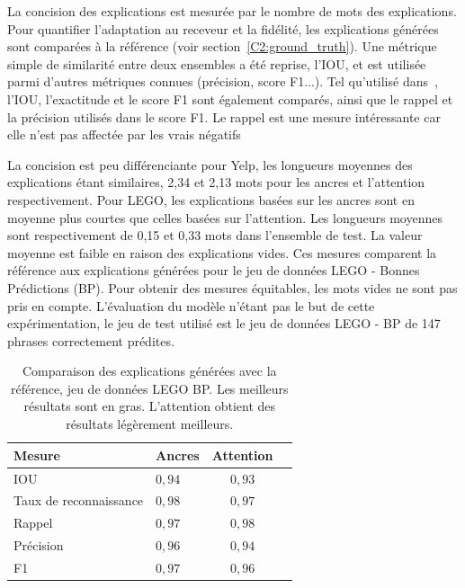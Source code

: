 La concision des explications est mesurée par le nombre de mots des explications.
Pour quantifier l'adaptation au receveur et la fidélité, les explications générées sont comparées à la référence (voir section~\ref{C2:ground_truth}). Une métrique simple de similarité entre deux ensembles a été reprise, l'IOU, et est utilisée parmi d'autres métriques connues (précision, score F1...).
Tel qu'utilisé dans~\cite{Bau2017}, l'IOU, l'exactitude et le score F1 sont également comparés, ainsi que le rappel et la précision utilisés dans le score F1. Le rappel est une mesure intéressante car elle n'est pas affectée par les vrais négatifs

La concision est peu différenciante pour Yelp, les longueurs moyennes des explications étant similaires, 2,34 et 2,13 mots pour les ancres et l'attention respectivement.
Pour LEGO, les explications basées sur les ancres sont en moyenne plus courtes que celles basées sur l'attention. Les longueurs moyennes sont respectivement de 0,15 et 0,33 mots dans l'ensemble de test. La valeur moyenne est faible en raison des explications vides.
Ces mesures comparent la référence aux explications générées pour le jeu de données LEGO - Bonnes Prédictions (BP). Pour obtenir des mesures équitables, les mots vides ne sont pas pris en compte. L'évaluation du modèle n'étant pas le but de cette expérimentation, le jeu de test utilisé est le jeu de données LEGO - BP de 147 phrases correctement prédites.

\begin{table}[h!tpb]
  \centering
\caption{Comparaison des explications générées avec la référence, jeu de données LEGO BP. Les meilleurs résultats sont en gras. L'attention obtient des résultats légèrement meilleurs.}\label{anchors_gt_lego_success}
\begin{tabular}{|l|l|c|c|}
  \hline
  \textbf{Mesure} & \textbf{Ancres} & \textbf{Attention} \\ \hline
  IOU             & $0,94$ & $0,93$ \\ \hline
  Taux de reconnaissance & $0,98$ & $0,97$ \\ \hline
  Rappel          & $0,97$ & $0,98$ \\ \hline
  Précision       & $0,96$ & $0,94$ \\ \hline
  F1              & $0,97$ & $0,96$ \\ \hline
\end{tabular}
\end{table}

